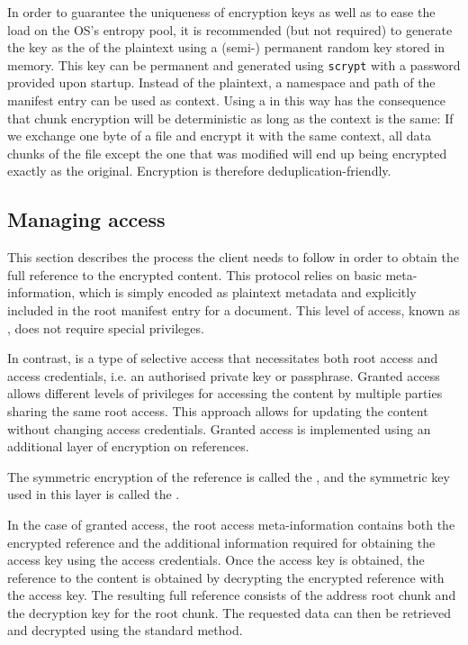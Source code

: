 In order to guarantee the uniqueness of encryption keys as well as to ease the load on the OS's entropy pool, it is recommended (but not required) to generate the key as the  of the plaintext using a (semi-) permanent random key stored in memory. 
This key can be permanent and generated using \lstinline{scrypt} \cite{percival2009stronger}
with a password provided upon startup. Instead of the plaintext, a namespace and path of the manifest entry can be used as context.
Using a  in this way has the consequence that chunk encryption will be deterministic as long as the context is the same: If we exchange one byte of a file and encrypt it with the same context, all data chunks of the file except the one that was modified will end up being encrypted exactly as the original. Encryption is therefore deduplication-friendly. 


\subsection{Managing access\statusgreen}\label{sec:managing-access}

This section describes the process the client needs to follow in order to obtain the full reference to the encrypted content. This protocol relies on basic meta-information, which is simply encoded as plaintext metadata and explicitly included in the root manifest entry for a document. This level of access, known as , does not require special privileges.

In contrast,  is a type of selective access that necessitates both root access and access credentials, i.e. an authorised private key or passphrase. Granted access allows different levels of privileges for accessing the content by multiple parties sharing the same root access. This approach allows for updating the content without changing access credentials. Granted access is implemented using an additional layer of encryption on references.

The symmetric encryption of the reference is called the , and the symmetric key used in this layer is called the .

In the case of granted access, the root access meta-information contains both the encrypted reference and the additional information required for obtaining the access key using the access credentials. Once the access key is obtained, the reference to the content is obtained by decrypting the encrypted reference with the access key. The resulting full reference consists of the address root chunk and the decryption key for the root chunk. The requested data can then be retrieved and decrypted using the standard method.

